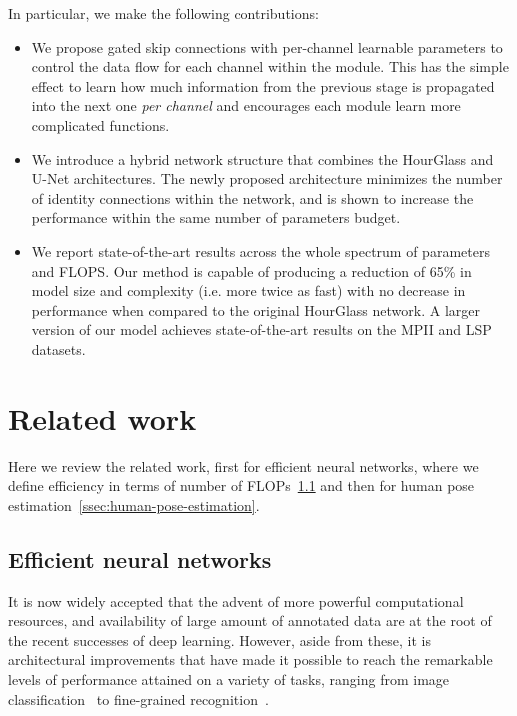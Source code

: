 \documentclass[a4paper, 10pt, conference]{ieeeconf}      \usepackage{FG2020}
\begin{document}
In particular, we make the following contributions: 
\begin{itemize}
    \item 
    We propose gated skip connections with per-channel learnable parameters to control the data flow for each channel within the module. This has the simple effect to learn how much information from the previous stage is propagated into the next one \textit{per channel} and encourages each module learn more complicated functions.  
    \item
    We introduce a hybrid network structure that combines the HourGlass \cite{newell2016stacked} and U-Net \cite{ronneberger2015u} architectures. The newly proposed architecture minimizes the number of identity connections within the network, and is shown to increase the performance within the same number of parameters budget.
    \item
    We report state-of-the-art results across the whole spectrum of  parameters and FLOPS. Our method is capable of producing a reduction of 65\% in model size and complexity (i.e. more twice as fast) with no decrease in performance when compared to the original HourGlass network. A larger version of our model achieves state-of-the-art results on the MPII and LSP datasets.
\end{itemize}

 \section{Related work}\label{sec:realted-work}
Here we review the related work, first for efficient neural networks, where we define efficiency in terms of number of FLOPs~\ref{ssec:efficient-cnns} and then for human pose estimation~\ref{ssec:human-pose-estimation}.

\subsection{Efficient neural networks}\label{ssec:efficient-cnns}

It is now widely accepted that the advent of more powerful computational resources, and availability of large amount of annotated data are at the root of the recent successes of deep learning.
However, aside from these, it is architectural improvements that have made it possible to reach the remarkable levels of performance attained on a variety of tasks, ranging from image classification~\cite{he2016deep,he2016identity} to fine-grained recognition~\cite{newell2016stacked,bulat2016human,wei2016convolutional}.
\end{document}
